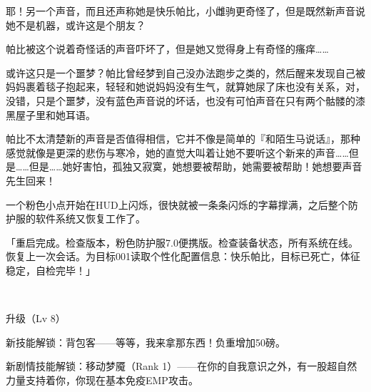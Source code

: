 耶！另一个声音，而且还声称她是快乐帕比，小雌驹更奇怪了，但是既然新声音说她不是机器，或许这是个朋友？


帕比被这个说着奇怪话的声音吓坏了，但是她又觉得身上有奇怪的瘙痒……{}


或许这只是一个噩梦？帕比曾经梦到自己没办法跑步之类的，然后醒来发现自己被妈妈裹着毯子抱起来，轻轻和她说妈妈没有生气，就算她尿了床也没有关系，对，没错，只是个噩梦，没有蓝色声音说的坏话，也没有可怕声音在只有两个骷髅的漆黑屋子里和她耳语。


帕比不太清楚新的声音是否值得相信，它并不像是简单的『和陌生马说话』，那种感觉就像是更深的悲伤与寒冷，她的直觉大叫着让她不要听这个新来的声音……但是……但是……她好害怕，孤独又寂寞，她想要被帮助，她需要被帮助！她想要声音先生回来！


一个粉色小点开始在HUD上闪烁，很快就被一条条闪烁的字幕撑满，之后整个防护服的软件系统又恢复工作了。

「{\mtzh 重启完成。检查版本，粉色防护服7.0便携版。检查装备状态，所有系统在线。恢复上一次会话。为目标001读取个性化配置信息：快乐帕比，目标已死亡，体征稳定，自检完毕！}」

\clearpage

~\vfill

\begin{note}
    升级（Lv 8）

    新技能解锁：背包客——等等，我来拿那东西！负重增加50磅。

    新剧情技能解锁：移动梦魇（Rank 1）——在你的自我意识之外，有一股超自然力量支持着你，你现在基本免疫EMP攻击。
\end{note}


